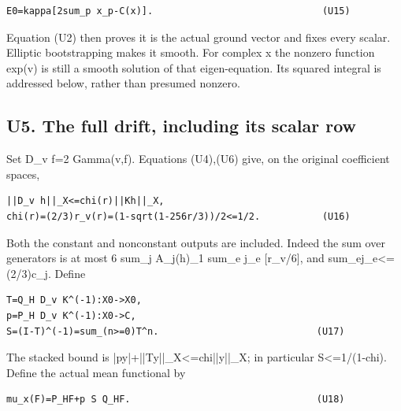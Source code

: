 \documentclass[11pt,a4paper]{article}
\renewcommand{\[}{\begingroup\small\originaldisplaystart}
\renewcommand{\]}{\originaldisplayend\endgroup}
\begin{document}
\begin{verbatim}
E0=kappa[2sum_p x_p-C(x)].                              (U15)
\end{verbatim}

Equation (U2) then proves it is the actual ground vector and fixes every
scalar. Elliptic bootstrapping makes it smooth. For complex x the
nonzero function exp(v) is still a smooth solution of that
eigen-equation. Its squared integral is addressed below, rather than
presumed nonzero.

\subsection{U5. The full drift, including its scalar
row}\label{u5.-the-full-drift-including-its-scalar-row}

Set D\_v f=2 Gamma(v,f). Equations (U4),(U6) give, on the original
coefficient spaces,

\begin{verbatim}
||D_v h||_X<=chi(r)||Kh||_X,
chi(r)=(2/3)r_v(r)=(1-sqrt(1-256r/3))/2<=1/2.           (U16)
\end{verbatim}

Both the constant and nonconstant outputs are included. Indeed the sum
over generators is at most 6 sum\_j
\textbar\textbar A\_j(h)\textbar\textbar\_1 sum\_e j\_e {[}r\_v/6{]},
and
{s\allowbreak{}u\allowbreak{}m\allowbreak{}\_\allowbreak{}e\allowbreak{}j\allowbreak{}\_\allowbreak{}e\allowbreak{}\textless{}\allowbreak{}=\allowbreak{}(\allowbreak{}2\allowbreak{}/\allowbreak{}3\allowbreak{})\allowbreak{}c\allowbreak{}\_\allowbreak{}j\allowbreak{}.\allowbreak{}}
Define

\begin{verbatim}
T=Q_H D_v K^(-1):X0->X0,
p=P_H D_v K^(-1):X0->C,
S=(I-T)^(-1)=sum_(n>=0)T^n.                            (U17)
\end{verbatim}

The stacked bound is
{|\allowbreak{}p\allowbreak{}y\allowbreak{}|\allowbreak{}+\allowbreak{}|\allowbreak{}|\allowbreak{}T\allowbreak{}y\allowbreak{}|\allowbreak{}|\allowbreak{}\_\allowbreak{}X\allowbreak{}\textless{}\allowbreak{}=\allowbreak{}c\allowbreak{}h\allowbreak{}i\allowbreak{}|\allowbreak{}|\allowbreak{}y\allowbreak{}|\allowbreak{}|\allowbreak{}\_\allowbreak{}X\allowbreak{};\allowbreak{}}
in particular \textbar\textbar S\textbar\textbar\textless=1/(1-chi).
Define the actual mean functional by

\begin{verbatim}
mu_x(F)=P_HF+p S Q_HF.                                 (U18)
\end{verbatim}
\end{document}
